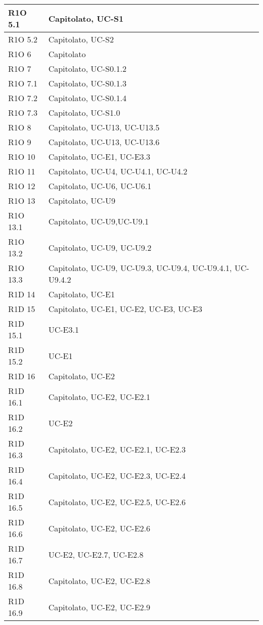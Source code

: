\begin{center}
\begin{longtable}{ | l | p{8cm} | }
    R1O 5.1 & Capitolato, UC-S1 \\ \hline
    R1O 5.2 & Capitolato, UC-S2 \\ \hline
    R1O 6 & Capitolato \\ \hline
    R1O 7 & Capitolato, UC-S0.1.2 \\ \hline
    R1O 7.1 & Capitolato, UC-S0.1.3 \\ \hline
    R1O 7.2 & Capitolato, UC-S0.1.4 \\ \hline
    R1O 7.3 & Capitolato, UC-S1.0 \\ \hline
    R1O 8 & Capitolato, UC-U13, UC-U13.5 \\ \hline
    R1O 9 & Capitolato, UC-U13, UC-U13.6 \\ \hline
    R1O 10 & Capitolato, UC-E1, UC-E3.3 \\ \hline
    R1O 11 & Capitolato, UC-U4, UC-U4.1, UC-U4.2\\ \hline
    R1O 12 & Capitolato, UC-U6, UC-U6.1 \\ \hline
    R1O 13 & Capitolato, UC-U9 \\ \hline
    R1O 13.1 & Capitolato, UC-U9,UC-U9.1 \\ \hline
    R1O 13.2 & Capitolato, UC-U9, UC-U9.2 \\ \hline
    R1O 13.3 & Capitolato, UC-U9, UC-U9.3, UC-U9.4, UC-U9.4.1, UC-U9.4.2\\ \hline
    R1D 14 & Capitolato, UC-E1 \\ \hline
    R1D 15 & Capitolato, UC-E1, UC-E2, UC-E3, UC-E3  \\ \hline
    R1D 15.1 & UC-E3.1  \\ \hline
    R1D 15.2 & UC-E1  \\ \hline
    R1D 16 & Capitolato, UC-E2 \\ \hline
    R1D 16.1 & Capitolato, UC-E2, UC-E2.1  \\ \hline
    R1D 16.2 & UC-E2 \\ \hline
    R1D 16.3 & Capitolato, UC-E2, UC-E2.1, UC-E2.3 \\ \hline
    R1D 16.4 & Capitolato, UC-E2, UC-E2.3, UC-E2.4  \\ \hline
    R1D 16.5 & Capitolato, UC-E2, UC-E2.5, UC-E2.6 \\ \hline
    R1D 16.6 & Capitolato, UC-E2, UC-E2.6 \\ \hline
    R1D 16.7 & UC-E2, UC-E2.7, UC-E2.8 \\ \hline
    R1D 16.8 & Capitolato, UC-E2, UC-E2.8 \\ \hline
    R1D 16.9 & Capitolato, UC-E2, UC-E2.9 \\ \hline

\end{longtable}
\end{center}
